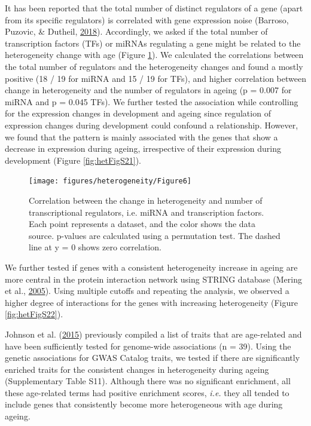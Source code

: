 \documentclass[12pt,twoside]{unicam}
\begin{document}
It has been reported that the total number of distinct regulators of a gene (apart from its specific regulators) is correlated with gene expression noise (Barroso, Puzovic, \& Dutheil, \protect\hyperlink{ref-Barroso2018}{2018}). Accordingly, we asked if the total number of transcription factors (TFs) or miRNAs regulating a gene might be related to the heterogeneity change with age (Figure \ref{fig:hetFig6}). We calculated the correlations between the total number of regulators and the heterogeneity changes and found a mostly positive (18 / 19 for miRNA and 15 / 19 for TFs), and higher correlation between change in heterogeneity and the number of regulators in ageing (p = 0.007 for miRNA and p = 0.045 TFs). We further tested the association while controlling for the expression changes in development and ageing since regulation of expression changes during development could confound a relationship. However, we found that the pattern is mainly associated with the genes that show a decrease in expression during ageing, irrespective of their expression during development (Figure \ref{fig:hetFigS21}).

\begin{figure}

{\centering \texttt{[image: figures/heterogeneity/Figure6]} 

}

\caption[Correlation between the change in heterogeneity and number of transcriptional regulators.]{Correlation between the change in heterogeneity and number of transcriptional regulators, i.e. miRNA and transcription factors. Each point represents a dataset, and the color shows the data source. p-values are calculated using a permutation test. The dashed line at y = 0 shows zero correlation.}\label{fig:hetFig6}
\end{figure}

We further tested if genes with a consistent heterogeneity increase in ageing are more central in the protein interaction network using STRING database (Mering et al., \protect\hyperlink{ref-VonMering2005}{2005}). Using multiple cutoffs and repeating the analysis, we observed a higher degree of interactions for the genes with increasing heterogeneity (Figure \ref{fig:hetFigS22}).

Johnson et al. (\protect\hyperlink{ref-Johnson2015}{2015}) previously compiled a list of traits that are age-related and have been sufficiently tested for genome-wide associations (n = 39). Using the genetic associations for GWAS Catalog traits, we tested if there are significantly enriched traits for the consistent changes in heterogeneity during ageing (Supplementary Table S11). Although there was no significant enrichment, all these age-related terms had positive enrichment scores, \emph{i.e.} they all tended to include genes that consistently become more heterogeneous with age during ageing.
\end{document}
